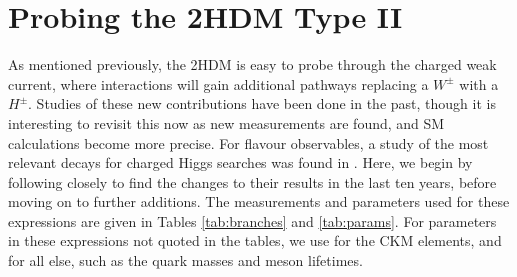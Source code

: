 \documentclass[a4paper,12pt]{article}
\begin{document}
\section{Probing the 2HDM Type II}
\label{sec:probe}
As mentioned previously, the 2HDM is easy to probe through the charged weak current, where interactions will gain additional pathways replacing a $W^{\pm}$ with a $H^{\pm}$. 
Studies of these new contributions have been done in the past, though it is interesting to revisit this now as new measurements are found, and SM calculations become more precise.
For flavour observables, a study of the most relevant decays for charged Higgs searches was found in \cite{desc}.
Here, we begin by following \cite{desc} closely to find the changes to their results in the last ten years, before moving on to further additions. 
The measurements and parameters used for these expressions are given in Tables \ref{tab:branches} and \ref{tab:params}.
For parameters in these expressions not quoted in the tables, we use \cite{ckm} for the CKM elements, and \cite{pdg} for all else, such as the quark masses and meson lifetimes.
\end{document}
